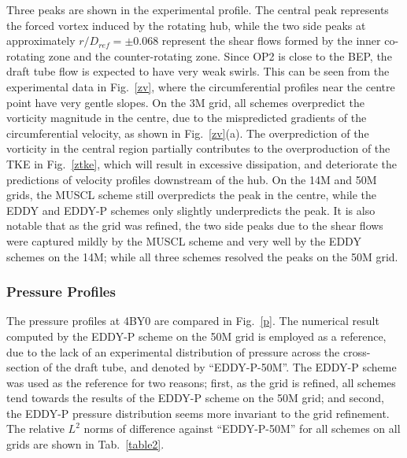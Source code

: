 Three peaks are shown in the experimental profile. The central peak represents the forced vortex induced by the rotating hub, while the two side peaks at approximately $r/D_{ref}=\pm 0.068$ represent the shear flows formed by the inner co-rotating zone and the counter-rotating zone. Since OP2 is close to the BEP, the draft tube flow is expected to have very weak swirls. This can be seen from the experimental data in Fig.~\ref{zv}, where the circumferential profiles near the centre point have very gentle slopes. On the 3M grid, all schemes overpredict the vorticity magnitude in the centre, due to the mispredicted gradients of the circumferential velocity, as shown in Fig.~\ref{zv}(a). The overprediction of the vorticity in the central region partially contributes to the overproduction of the TKE in Fig.~\ref{ztke}, which will result in excessive dissipation, and deteriorate the predictions of velocity profiles downstream of the hub. On the 14M and 50M grids, the MUSCL scheme still overpredicts the peak in the centre, while the EDDY and EDDY-P schemes only slightly underpredicts the peak. It is also notable that as the grid was refined, the two side peaks due to the shear flows were captured mildly by the MUSCL scheme and very well by the EDDY schemes on the 14M; while all three schemes resolved the peaks on the 50M grid. 

\subsubsection{Pressure Profiles}
The pressure profiles at 4BY0 are compared in Fig.~\ref{p}. The numerical result computed by the EDDY-P scheme on the 50M grid is employed as a reference, due to the lack of an experimental distribution of pressure across the cross-section of the draft tube, and denoted by ``EDDY-P-50M''. The EDDY-P scheme was used as the reference for two reasons; first, as the grid is refined, all schemes tend towards the results of the EDDY-P scheme on the 50M grid; and second, the EDDY-P pressure distribution seems more invariant to the grid refinement. The relative $L^{2}$ norms of difference against ``EDDY-P-50M'' for all schemes on all grids are shown in Tab.~\ref{table2}. 

